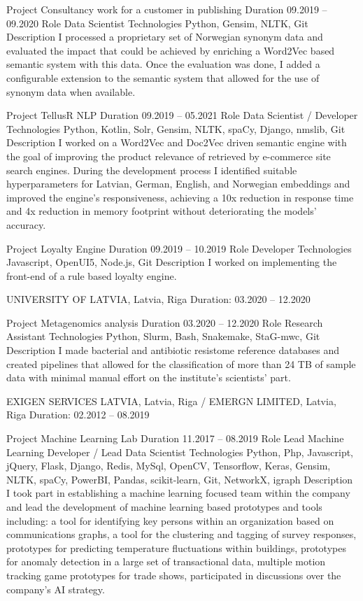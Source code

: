 \documentclass[12pt]{article}
\begin{document}
Project
Consultancy work for a customer in publishing
Duration
09.2019 – 09.2020
Role
Data Scientist
Technologies
Python, Gensim, NLTK, Git
Description
I processed a proprietary set of Norwegian synonym data and evaluated the impact that could be achieved by enriching a Word2Vec based semantic system with this data. Once the evaluation was done, I added a configurable extension to the semantic system that allowed for the use of synonym data when available.

Project
TellusR NLP
Duration
09.2019 – 05.2021
Role
Data Scientist / Developer
Technologies
Python, Kotlin, Solr, Gensim, NLTK, spaCy, Django, nmslib, Git
Description
I worked on a Word2Vec and Doc2Vec driven semantic engine with the goal of improving the product relevance of retrieved by e-commerce site search engines. During the development process I identified suitable hyperparameters for Latvian, German, English, and Norwegian embeddings and improved the engine's responsiveness, achieving a 10x reduction in response time and 4x reduction in memory footprint without deteriorating the models' accuracy.

Project
Loyalty Engine
Duration
09.2019 – 10.2019
Role
Developer
Technologies
Javascript, OpenUI5, Node.js, Git
Description
I worked on implementing the front-end of a rule based loyalty engine.

UNIVERSITY OF LATVIA, Latvia, Riga
Duration: 03.2020 – 12.2020

Project
Metagenomics analysis
Duration
03.2020 – 12.2020
Role
Research Assistant
Technologies
Python, Slurm, Bash, Snakemake, StaG-mwc, Git
Description
I made bacterial and antibiotic resistome reference databases and created pipelines that allowed for the classification of more than 24 TB of sample data with minimal manual effort on the institute's scientists' part.

EXIGEN SERVICES LATVIA, Latvia, Riga / EMERGN LIMITED, Latvia, Riga
Duration: 02.2012 – 08.2019

Project
Machine Learning Lab
Duration
11.2017 – 08.2019
Role
Lead Machine Learning Developer / Lead Data Scientist
Technologies
Python, Php, Javascript, jQuery, Flask, Django, Redis, MySql, OpenCV, Tensorflow, Keras, Gensim, NLTK, spaCy, PowerBI, Pandas, scikit-learn, Git, NetworkX, igraph
Description
I took part in establishing a machine learning focused team within the company and lead the development of machine learning based prototypes and tools including:
a tool for identifying key persons within an organization based on communications graphs,
a tool for the clustering and tagging of survey responses,
prototypes for predicting temperature fluctuations within buildings,
prototypes for anomaly detection in a large set of transactional data,
multiple motion tracking game prototypes for trade shows,
participated in discussions over the company's AI strategy.
\end{document}
